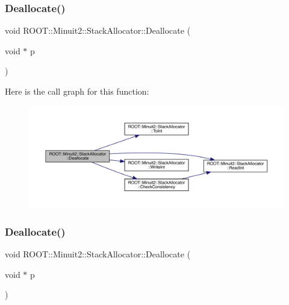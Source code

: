 \mbox{\label{classROOT_1_1Minuit2_1_1StackAllocator_ac36426e01e1474491cef1b203dba2f0c}} 
\subsubsection{\texorpdfstring{Deallocate()}{Deallocate()}\hspace{0.1cm}{\footnotesize\ttfamily [2/3]}}
{\footnotesize\ttfamily void R\+O\+O\+T\+::\+Minuit2\+::\+Stack\+Allocator\+::\+Deallocate (\begin{DoxyParamCaption}\item[{void $\ast$}]{p }\end{DoxyParamCaption})\hspace{0.3cm}{\ttfamily [inline]}}

Here is the call graph for this function\+:
\nopagebreak
\begin{figure}[H]
\begin{center}
\leavevmode
\includegraphics[width=350pt]{d3/d1e/classROOT_1_1Minuit2_1_1StackAllocator_ac36426e01e1474491cef1b203dba2f0c_cgraph}
\end{center}
\end{figure}
\mbox{\label{classROOT_1_1Minuit2_1_1StackAllocator_ac36426e01e1474491cef1b203dba2f0c}} 
\subsubsection{\texorpdfstring{Deallocate()}{Deallocate()}\hspace{0.1cm}{\footnotesize\ttfamily [3/3]}}
{\footnotesize\ttfamily void R\+O\+O\+T\+::\+Minuit2\+::\+Stack\+Allocator\+::\+Deallocate (\begin{DoxyParamCaption}\item[{void $\ast$}]{p }\end{DoxyParamCaption})\hspace{0.3cm}{\ttfamily [inline]}}

